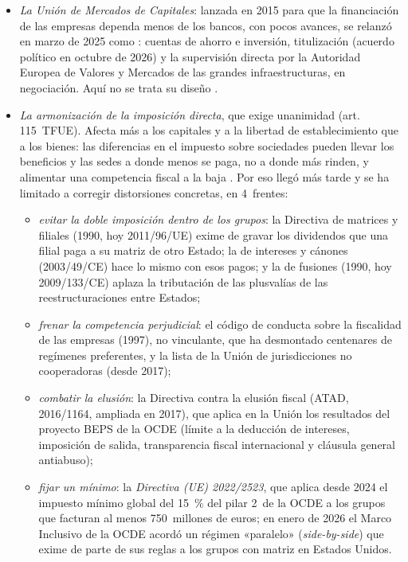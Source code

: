 \documentclass[11pt]{article}
\begin{document}
\begin{itemize}
\item \emph{La Unión de Mercados de Capitales}: lanzada en 2015 para que la financiación de las empresas dependa menos de los bancos, con pocos avances, se relanzó en marzo de 2025 como : cuentas de ahorro e inversión, titulización (acuerdo político en octubre de 2026) y la supervisión directa por la Autoridad Europea de Valores y Mercados de las grandes infraestructuras, en negociación\nocite{CE2025UAI}. Aquí no se trata su diseño .
\item \emph{La armonización de la imposición directa}, que exige unanimidad (art. 115~TFUE). Afecta más a los capitales y a la libertad de establecimiento que a los bienes: las diferencias en el impuesto sobre sociedades pueden llevar los beneficios y las sedes a donde menos se paga, no a donde más rinden, y alimentar una competencia fiscal a la baja . Por eso llegó más tarde y se ha limitado a corregir distorsiones concretas, en 4~frentes:
  \begin{itemize}
  \item \emph{evitar la doble imposición dentro de los grupos}: la Directiva de matrices y filiales (1990, hoy 2011/96/UE) exime de gravar los dividendos que una filial paga a su matriz de otro Estado; la de intereses y cánones (2003/49/CE) hace lo mismo con esos pagos; y la de fusiones (1990, hoy 2009/133/CE) aplaza la tributación de las plusvalías de las reestructuraciones entre Estados;
  \item \emph{frenar la competencia perjudicial}: el código de conducta sobre la fiscalidad de las empresas (1997), no vinculante, que ha desmontado centenares de regímenes preferentes, y la lista de la Unión de jurisdicciones no cooperadoras (desde 2017);
  \item \emph{combatir la elusión}: la Directiva contra la elusión fiscal (ATAD, 2016/1164, ampliada en 2017), que aplica en la Unión los resultados del proyecto BEPS de la OCDE (límite a la deducción de intereses, imposición de salida, transparencia fiscal internacional y cláusula general antiabuso);
  \item \emph{fijar un mínimo}: la \emph{Directiva (UE) 2022/2523}, que aplica desde 2024 el impuesto mínimo global del 15~\% del pilar 2~de la OCDE a los grupos que facturan al menos 750~millones de euros; en enero de 2026 el Marco Inclusivo de la OCDE acordó un régimen «paralelo» (\emph{side-by-side}) que exime de parte de sus reglas a los grupos con matriz en Estados Unidos\nocite{UE2022Pilar2,OCDE2026SideBySide}.

\end{itemize}
\end{itemize}
\end{document}
